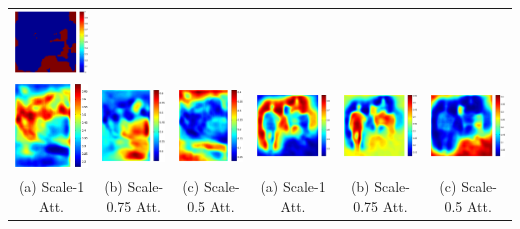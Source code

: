 \documentclass[landscape,final,a0paper,fontscale=0.285]{baposter}
\begin{document}
\begin{poster}
{{\begin{tabular}{c c c | c c c}
      {\includegraphics[height=0.1\linewidth, width=0.12\linewidth]{fig/attention/voc10_part/att3/2008_003344_max.pdf}} \\
      {\includegraphics[height=0.1\linewidth, width=0.12\linewidth]{fig/attention/voc10_part/att1/2008_000034.pdf}} &
      {\includegraphics[height=0.1\linewidth, width=0.12\linewidth]{fig/attention/voc10_part/att2/2008_000034.pdf}} &
      {\includegraphics[height=0.1\linewidth, width=0.12\linewidth]{fig/attention/voc10_part/att3/2008_000034.pdf}} &
      {\includegraphics[height=0.1\linewidth, width=0.12\linewidth]{fig/attention/voc10_part/att1/2008_003344.pdf}} &
      {\includegraphics[height=0.1\linewidth, width=0.12\linewidth]{fig/attention/voc10_part/att2/2008_003344.pdf}} &
      {\includegraphics[height=0.1\linewidth, width=0.12\linewidth]{fig/attention/voc10_part/att3/2008_003344.pdf}} \\
                      {{\tiny (a) Scale-1 Att.}} &
                      {{\tiny (b) Scale-0.75 Att.}} &
                      {{\tiny (c) Scale-0.5 Att.}} &
                      {{\tiny (a) Scale-1 Att.}} &
                      {{\tiny (b) Scale-0.75 Att.}} &
                      {{\tiny (c) Scale-0.5 Att.}} \\
    \end{tabular}
    }

}
\end{poster}
\end{document}
